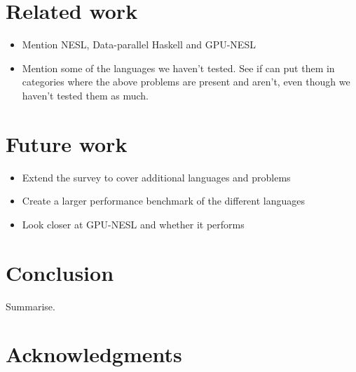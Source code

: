 \documentclass{llncs2e/llncs}
\begin{document}
\section{Related work}
\begin{itemize}
\item Mention NESL, Data-parallel Haskell and GPU-NESL
\item Mention some of the languages we haven't tested. See if can put
  them in categories where the above problems are present and aren't,
  even though we haven't tested them as much.
\end{itemize}

\section{Future work}
\begin{itemize}
\item Extend the survey to cover additional languages and problems
\item Create a larger performance benchmark of the different languages
\item Look closer at GPU-NESL and whether it performs
\end{itemize}

\section{Conclusion}
Summarise.

\section{Acknowledgments}

 

\end{document}
